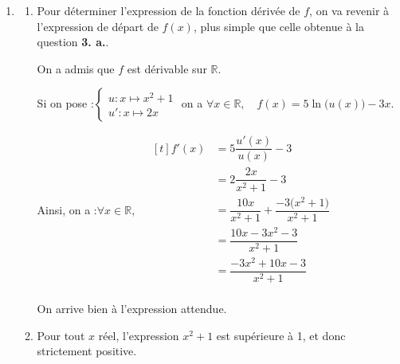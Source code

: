 \documentclass[10pt]{article}
\providecommand{\R}{\mathbb{R}}
\begin{document}
\begin{enumerate}
\begin{enumerate}
\begin{itemize}
Donc par produit et somme,\quad $ \lim\limits_{x\to +\infty} 10\dfrac{\ln(x)}{x} - 3= - 3$.

De plus \quad $\lim\limits_{x \to +\infty } x = +\infty $ \quad donc par produit, \quad $\lim\limits_{x \to +\infty } x\left(10 \dfrac{\ln x}{x}- 3\right) = -\infty$.

			\item D'autre part :
\quad
$ \begin{cases} \lim\limits_{x \to +\infty } 1 + \dfrac{1}{x^2} = 1 \\
\lim\limits_{X \to 1} \ln(X) = 0 \end{cases} $ \quad par composition, \quad $ \lim\limits_{x \to +\infty} \ln \left(1+\dfrac{1}{x^{2}}\right) = 0$

Par produit on a donc $ \lim\limits_{x \to +\infty} 5 \ln \left(1+\dfrac{1}{x^{2}}\right) = 0$.
		\end{itemize}

		Finalement, par somme,\quad $\lim\limits_{x \to +\infty} f(x) = -\infty$.
\end{enumerate}
\item
	\begin{enumerate}
		\item Pour déterminer l'expression de la fonction dérivée de $f$, on va revenir à l'expression de départ de $f(x)$, plus simple que celle obtenue à la question \textbf{3. a.}.

On a admis que $f$ est dérivable sur $\R$.

Si on pose :\quad $\begin{cases}u : x \longmapsto x^2 + 1\\ u' : x \longmapsto 2x \end{cases}$ \quad on a \quad $\forall x \in \R,\quad f(x) = 5\ln\big(u(x)\big) - 3x$.

Ainsi, on a :\quad $\forall x \in \R,\quad \begin{aligned}[t]
	f'(x) &= 5\dfrac{u'(x)}{u(x)}-3\\
	&=2\dfrac{2x}{x^2 + 1} - 3\\
	&=\dfrac{10x}{x^2 + 1} + \dfrac{-3\big(x^2 + 1\big)}{x^2 + 1}\\
	&=\dfrac{10x -3x^2 - 3}{x^2 + 1}\\
	&=\dfrac{-3x^2 + 10x - 3}{x^2 + 1}\\
\end{aligned}$

On arrive bien à l'expression attendue.

\item Pour tout $x$ réel, l'expression \quad $x^2 + 1$ \quad est supérieure à 1, et donc strictement positive.


\end{enumerate}
\end{enumerate}
\end{document}
